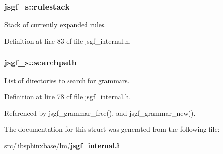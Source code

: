\subsubsection[{rulestack}]{ {\bf jsgf\-\_\-s\-::rulestack}}\label{structjsgf__s_a0980112df6f2f591e64158266eb04b69}


\-Stack of currently expanded rules. 



\-Definition at line 83 of file jsgf\-\_\-internal.\-h.

\subsubsection[{searchpath}]{ {\bf jsgf\-\_\-s\-::searchpath}}\label{structjsgf__s_aabb207f0909c661a831e5f931dd9f60e}


\-List of directories to search for grammars. 



\-Definition at line 78 of file jsgf\-\_\-internal.\-h.



\-Referenced by jsgf\-\_\-grammar\-\_\-free(), and jsgf\-\_\-grammar\-\_\-new().



\-The documentation for this struct was generated from the following file\-:\begin{DoxyCompactItemize}
\item 
src/libsphinxbase/lm/{\bf jsgf\-\_\-internal.\-h}\end{DoxyCompactItemize}
